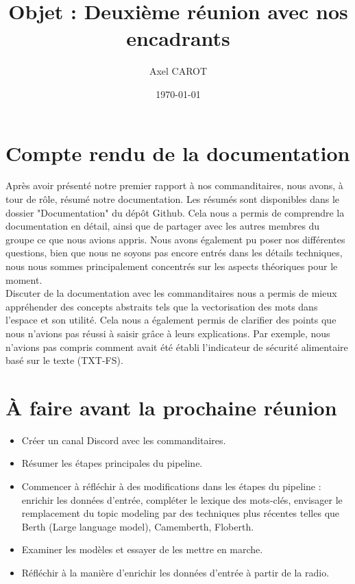 \documentclass{article}
\title{Objet : Deuxième réunion avec nos encadrants}
\author{Axel CAROT}
\date{\today}
\begin{document}
\maketitle

\section{Compte rendu de la documentation}
Après avoir présenté notre premier rapport à nos commanditaires, nous avons, à tour de rôle, résumé notre documentation. Les résumés sont disponibles dans le dossier "Documentation" du dépôt Github. Cela nous a permis de comprendre la documentation en détail, ainsi que de partager avec les autres membres du groupe ce que nous avions appris. Nous avons également pu poser nos différentes questions, bien que nous ne soyons pas encore entrés dans les détails techniques, nous nous sommes principalement concentrés sur les aspects théoriques pour le moment. \\

Discuter de la documentation avec les commanditaires nous a permis de mieux appréhender des concepts abstraits tels que la vectorisation des mots dans l'espace et son utilité. Cela nous a également permis de clarifier des points que nous n'avions pas réussi à saisir grâce à leurs explications. Par exemple, nous n'avions pas compris comment avait été établi l'indicateur de sécurité alimentaire basé sur le texte (TXT-FS).

\section{À faire avant la prochaine réunion}

\begin{itemize}
    \item Créer un canal Discord avec les commanditaires.
    \item Résumer les étapes principales du pipeline.
    \item Commencer à réfléchir à des modifications dans les étapes du pipeline : enrichir les données d’entrée, compléter le lexique des mots-clés, envisager le remplacement du topic modeling par des techniques plus récentes telles que Berth (Large language model), Camemberth, Floberth.
    \item Examiner les modèles et essayer de les mettre en marche.
    \item Réfléchir à la manière d'enrichir les données d'entrée à partir de la radio.
\end{itemize}
\end{document}
